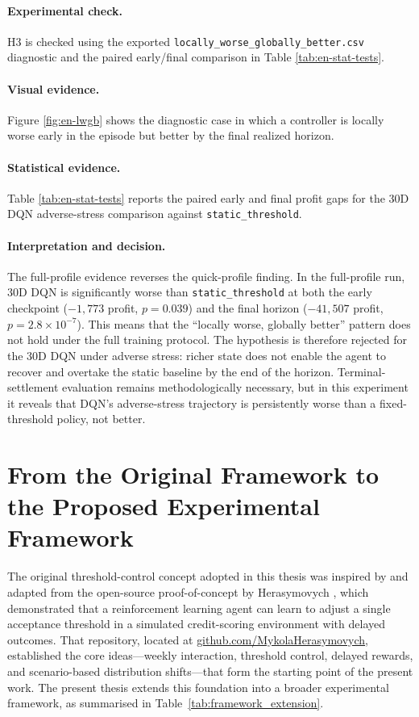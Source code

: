 \documentclass[12pt,a4paper]{article}
\begin{document}
\paragraph{Experimental check.}
H3 is checked using the exported \texttt{locally\_worse\_globally\_better.csv} diagnostic and the paired early/final comparison in Table \ref{tab:en-stat-tests}.

\paragraph{Visual evidence.}
Figure \ref{fig:en-lwgb} shows the diagnostic case in which a controller is locally worse early in the episode but better by the final realized horizon.

\paragraph{Statistical evidence.}
Table \ref{tab:en-stat-tests} reports the paired early and final profit gaps for the 30D DQN adverse-stress comparison against \texttt{static\_threshold}.

\paragraph{Interpretation and decision.}
The full-profile evidence reverses the quick-profile finding. In the full-profile run, 30D DQN is significantly worse than \texttt{static\_threshold} at both the early checkpoint ($-1{,}773$ profit, $p = 0.039$) and the final horizon ($-41{,}507$ profit, $p = 2.8 \times 10^{-7}$). This means that the ``locally worse, globally better'' pattern does not hold under the full training protocol. The hypothesis is therefore rejected for the 30D DQN under adverse stress: richer state does not enable the agent to recover and overtake the static baseline by the end of the horizon. Terminal-settlement evaluation remains methodologically necessary, but in this experiment it reveals that DQN's adverse-stress trajectory is persistently worse than a fixed-threshold policy, not better.

\section{From the Original Framework to the Proposed Experimental Framework}

The original threshold-control concept adopted in this thesis was inspired by and adapted from the open-source proof-of-concept by Herasymovych \cite{herasymovych2019}, which demonstrated that a reinforcement learning agent can learn to adjust a single acceptance threshold in a simulated credit-scoring environment with delayed outcomes. That repository, located at \href{https://github.com/MykolaHerasymovych/Optimizing-Acceptance-Threshold-in-Credit-Scoring-using-Reinforcement-Learning}{github.com/MykolaHerasymovych}, established the core ideas---weekly interaction, threshold control, delayed rewards, and scenario-based distribution shifts---that form the starting point of the present work. The present thesis extends this foundation into a broader experimental framework, as summarised in Table~\ref{tab:framework_extension}.
\end{document}
